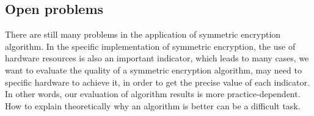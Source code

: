 \documentclass[11pt]{article}
\begin{document}
\subsection{Open problems}
There are still many problems in the application of symmetric encryption algorithm. In the specific implementation of symmetric encryption, the use of hardware resources is also an important indicator, which leads to many cases, we want to evaluate the quality of a symmetric encryption algorithm, may need to specific hardware to achieve it, in order to get the precise value of each indicator. In other words, our evaluation of algorithm results is more practice-dependent. How to explain theoretically why an algorithm is better can be a difficult task.



\end{document}
